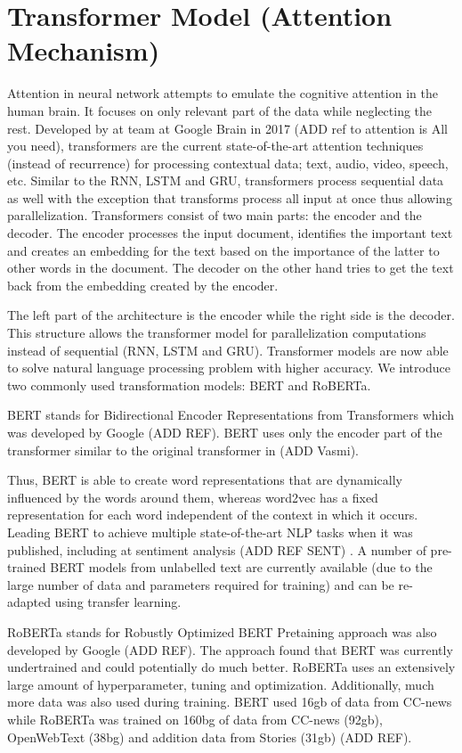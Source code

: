 \section{Transformer Model (Attention Mechanism)}
Attention in neural network attempts to emulate the cognitive attention in the human brain. It focuses on only relevant part of the data while neglecting the rest. Developed by at team at Google Brain in 2017 (ADD ref to attention is All you need), transformers are the current state-of-the-art attention techniques (instead of recurrence) for processing contextual data; text, audio, video, speech, etc. Similar to the RNN, LSTM and GRU, transformers process sequential data as well with the exception that transforms process all input at once thus allowing parallelization. Transformers consist of two main parts: the encoder and the decoder. The encoder processes the input document, identifies the important text and creates an embedding for the text based on the importance of the latter to other words in the document. The decoder on the other hand tries to get the text back from the embedding created by the encoder.

The left part of the architecture is the encoder while the right side is the decoder. This structure allows the transformer model for parallelization computations instead of sequential (RNN, LSTM and GRU). Transformer models are now able to solve natural language processing problem with higher accuracy.  We introduce two commonly used transformation models: BERT and RoBERTa. 

BERT stands for Bidirectional Encoder Representations from Transformers which was developed by Google (ADD REF). BERT uses only the encoder part of the transformer similar to the original transformer in (ADD Vasmi). 

Thus, BERT is able to create word representations that are dynamically influenced by the words around them, whereas word2vec has a fixed representation for each word independent of the context in which it occurs. Leading BERT to achieve multiple state-of-the-art NLP tasks when it was published, including at sentiment analysis (ADD REF SENT) . A number of pre-trained BERT models from unlabelled text are currently available (due to the large number of data and parameters required for training) and can be re-adapted using transfer learning. 

RoBERTa stands for Robustly Optimized BERT Pretaining approach was also developed by Google (ADD REF). The approach found that BERT was currently undertrained and could potentially do much better. RoBERTa uses an extensively large amount of hyperparameter, tuning and optimization. Additionally, much more data was also used during training. BERT used 16gb of data from CC-news while RoBERTa was trained on 160bg of data from CC-news (92gb), OpenWebText (38bg) and addition data from Stories (31gb) (ADD REF).
